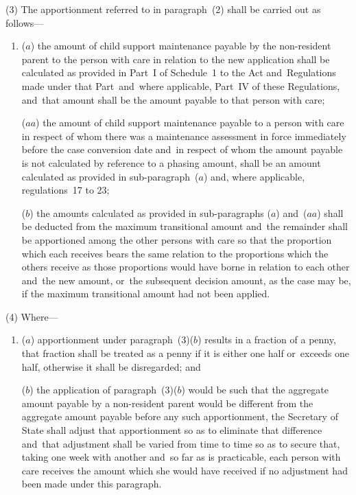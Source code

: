 \documentclass[12pt,a4paper]{article}
\begin{document}
(3) The apportionment referred to in paragraph~(2) shall be carried out as follows—
\begin{enumerate}\item[]
($a$) the amount of child support maintenance payable by the non-resident parent to the person with care in relation to the new application shall be calculated as provided in Part~I of Schedule~1 to the Act and~Regulations made under that Part~and~where applicable, Part~IV of these Regulations, and~that amount shall be the amount payable to that person with care;

($aa$) the amount of child support maintenance payable to a person with care in respect of whom there was a maintenance assessment in force immediately before the case conversion date and~in respect of whom the amount payable is not calculated by reference to a phasing amount, shall be an amount calculated as provided in sub-paragraph~($a$)  and, where applicable, regulations~17 to 23;

($b$) 
the amounts calculated as provided in sub-paragraphs ($a$)  and~($aa$)  %
shall be deducted from the maximum transitional amount and~the remainder shall be apportioned among the other persons with care so that the proportion which each receives bears the same relation to the proportions which the others receive as those proportions would have borne in relation to each other and~the new amount, or~the subsequent decision amount, as the case may be, if the maximum transitional amount had not been applied.
\end{enumerate}

(4) Where—
\begin{enumerate}\item[]
($a$) apportionment under paragraph~(3)($b$)  results in a fraction of a penny, that fraction shall be treated as a penny if it is either one half or~exceeds one half, otherwise it shall be disregarded; and

($b$) the application of paragraph~(3)($b$)  would be such that the aggregate amount payable by a non-resident parent would be different from the aggregate amount payable before any such apportionment, the Secretary of State shall adjust that apportionment so as to eliminate that difference and~that adjustment shall be varied from time to time so as to secure that, taking one week with another and~so far as is practicable, each person with care receives the amount which she would have received if no adjustment had been made under this paragraph.
\end{enumerate}
\end{document}
